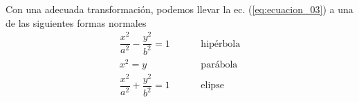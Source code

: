 \par
\begin{center}
\end{center}
Con una adecuada transformación, podemos llevar la ec. (\ref{eq:ecuacion_03}) a una de las siguientes formas normales
\begin{align*}
\dfrac{x^{2}}{a^{2}} - \dfrac{y^{2}}{b^{2}} =  1 \hspace{1cm} &\text{hipérbola} \\[1em]
x^{2} = y \hspace{1cm} &\text{parábola} \\[1em]
\dfrac{x^{2}}{a^{2}} + \dfrac{y^{2}}{b^{2}} =  1 \hspace{1cm} &\text{elipse}
\end{align*}
